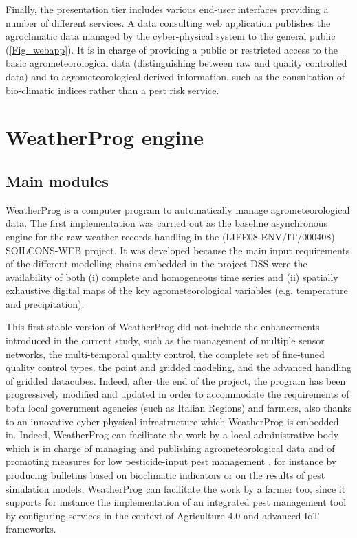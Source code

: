 \documentclass[authoryear,preprint,review,12pt]{elsarticle}
\newcommand{\note}[1]{\emph{\textcolor{red}{#1}}}
\begin{document}
Finally, the presentation tier includes various end-user interfaces providing a number of different services.
A data consulting web application publishes the agroclimatic data managed by the cyber-physical system to the general public (\cref{Fig_webapp}).
It is in charge of providing a public or restricted access to the basic agrometeorological data (distinguishing between raw and quality controlled data) and to agrometeorological derived information, such as the consultation of bio-climatic indices rather than a pest risk service.

\section{WeatherProg engine}\label{sec:weatherprog}
\subsection{Main modules}
WeatherProg \citep{langella:weatherprog2014} is a computer program to automatically manage agrometeorological data.
The first implementation was carried out as the baseline asynchronous engine for the raw weather records handling in the (LIFE08 ENV/IT/000408) SOILCONS-WEB project.
It was developed because the main input requirements of the different modelling chains embedded in the project DSS \citep{Terribile:soilconsweb:2015} were the availability of both (i) complete and homogeneous time series and (ii) spatially exhaustive digital maps of the key agrometeorological variables (e.g. temperature and precipitation). 

This first stable version of WeatherProg did not include the enhancements introduced in the current study, such as the management of multiple sensor networks, the multi-temporal quality control, the complete set of fine-tuned quality control types, the point and gridded modeling, and the advanced handling of gridded datacubes.
Indeed, after the end of the project, the program has been progressively modified and updated in order to accommodate the requirements of both local government agencies (such as Italian Regions) and farmers, also thanks to an innovative cyber-physical infrastructure which WeatherProg is embedded in.
Indeed, WeatherProg can facilitate the work by a local administrative body which is in charge of managing and publishing agrometeorological data and of promoting measures for low pesticide-input pest management \citep{eu:dir128:2009}, for instance by producing bulletins based on bioclimatic indicators or on the results of pest simulation models.
WeatherProg can facilitate the work by a farmer too, since it supports for instance the implementation of an integrated pest management tool \citep{Terribile:dssvitis:2017} by configuring services in the context of Agriculture 4.0 and advanced IoT frameworks.
\end{document}
